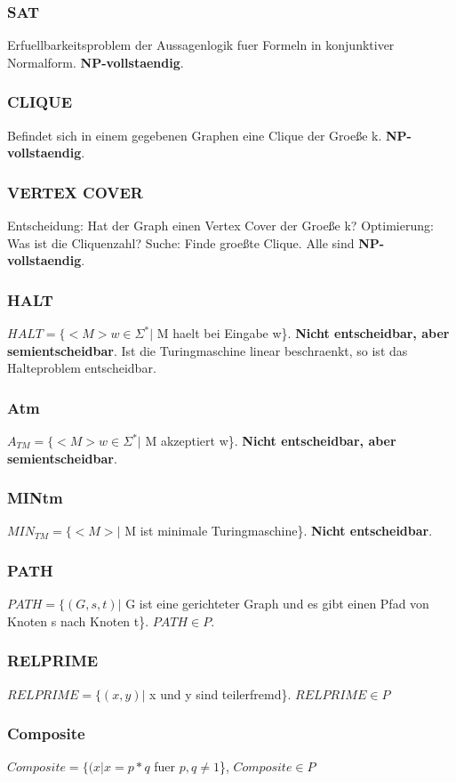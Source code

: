 \documentclass[a4paper]{scrreprt}
\begin{document}
\subsubsection{SAT} Erfuellbarkeitsproblem der Aussagenlogik fuer Formeln in konjunktiver Normalform. \textbf{NP-vollstaendig}.
\subsubsection{CLIQUE} Befindet sich in einem gegebenen Graphen eine Clique der Groeße k. \textbf{NP-vollstaendig}.
\subsubsection{VERTEX COVER} Entscheidung: Hat der Graph einen Vertex Cover der Groeße k? Optimierung: Was ist die Cliquenzahl? Suche: Finde groeßte Clique. Alle sind \textbf{NP-vollstaendig}.
\subsubsection{HALT} $HALT = \{<M> w \in \Sigma^*|$ M haelt bei Eingabe w\}. \textbf{Nicht entscheidbar, aber semientscheidbar}. Ist die Turingmaschine linear beschraenkt, so ist das Halteproblem entscheidbar.
\subsubsection{Atm} $A_{TM} = \{<M> w \in \Sigma^*|$ M akzeptiert w\}. \textbf{Nicht entscheidbar, aber semientscheidbar}.
\subsubsection{MINtm} $MIN_{TM} = \{<M>|$ M ist minimale Turingmaschine\}. \textbf{Nicht entscheidbar}.
\subsubsection{PATH} $PATH = \{(G, s, t)|$ G ist eine gerichteter Graph und es gibt einen Pfad von Knoten s nach Knoten t\}. \textbf{$PATH \in P$}.
\subsubsection{RELPRIME} $RELPRIME = \{(x, y)|$ x und y sind teilerfremd\}. \textbf{$RELPRIME \in P$}
\subsubsection{Composite} $Composite = \{(x|x = p * q$ fuer $p,q \neq 1$\}, \textbf{$Composite \in P$}
\end{document}

